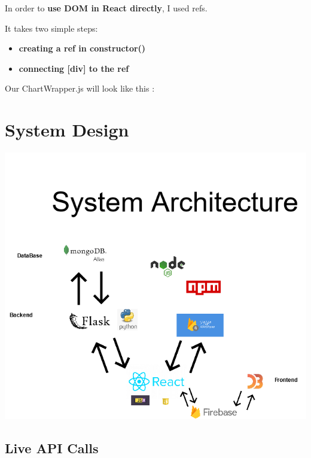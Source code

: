 In order to \textbf{use DOM in React directly}, I used refs.

It takes two simple steps:

\begin{itemize}

\item \textbf{creating a ref in constructor()}
\item \textbf{connecting [div] to the ref}

\end{itemize}

Our ChartWrapper.js will look like this :


\chapter{System Design}
\begin{center}
      \includegraphics[scale=0.5]{img/basic architecture.png}
\end{center}

\section{Live API Calls}


